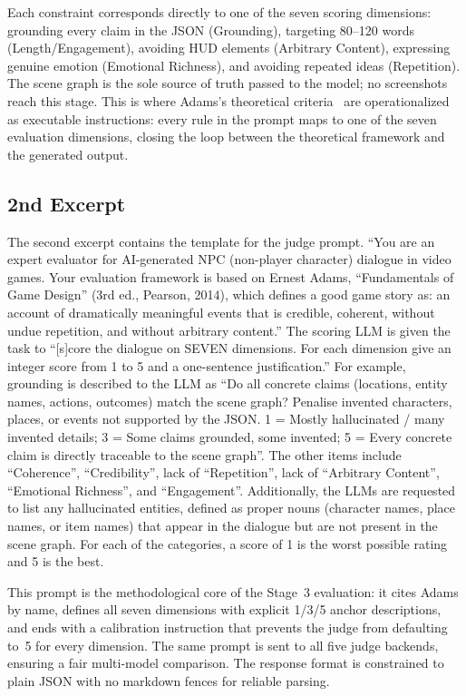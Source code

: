 \documentclass{article}
\begin{document}
Each constraint corresponds directly to one of the seven scoring dimensions: grounding every claim in the JSON (Grounding), targeting 80--120 words (Length/Engagement), avoiding HUD elements (Arbitrary Content), expressing genuine emotion (Emotional Richness), and avoiding repeated ideas (Repetition). The scene graph is the sole source of truth passed to the model; no screenshots reach this stage.
This is where Adams's theoretical criteria~\cite{Adams2014} are operationalized as executable instructions: every rule in the prompt maps to one of the seven evaluation dimensions, closing the loop between the theoretical framework and the generated output.


\subsection{2nd Excerpt}

The second excerpt contains the template for the judge prompt.
``You are an expert evaluator for AI-generated NPC (non-player character) dialogue
in video games. Your evaluation framework is based on Ernest Adams,
``Fundamentals of Game Design'' (3rd ed., Pearson, 2014), which defines a good game story as:
an account of dramatically meaningful events that is credible, coherent,
without undue repetition, and without arbitrary content.''
The scoring LLM is given the task to ``[s]core the dialogue on SEVEN dimensions. For each dimension give an integer score from 1 to 5
and a one-sentence justification.''
For example, grounding is described to the LLM as ``Do all concrete claims (locations, entity names, actions, outcomes) match the
  scene graph? Penalise invented characters, places, or events not supported by the JSON.   1 = Mostly hallucinated / many invented details;
  3 = Some claims grounded, some invented;
  5 = Every concrete claim is directly traceable to the scene graph''.
The other items include ``Coherence'', ``Credibility'', lack of ``Repetition'', lack of ``Arbitrary Content'', ``Emotional Richness'', and ``Engagement''.
Additionally, the LLMs are requested to list any hallucinated entities, defined as proper nouns (character names, place names, or item names) that appear in the dialogue but are not present in the scene graph.
For each of the categories, a score of 1 is the worst possible rating and 5 is the best.

This prompt is the methodological core of the Stage~3 evaluation: it cites Adams by name, defines all seven dimensions with explicit 1/3/5 anchor descriptions, and ends with a calibration instruction that prevents the judge from defaulting to~5 for every dimension. The same prompt is sent to all five judge backends, ensuring a fair multi-model comparison. The response format is constrained to plain JSON with no markdown fences for reliable parsing.
\end{document}
